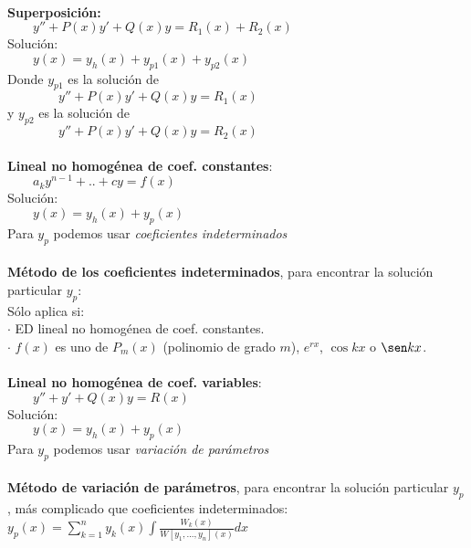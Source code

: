 \documentclass[a4paper,landscape,10pt]{cheatsheet}
\begin{document}
\hfill\\
\textbf{Superposición:}\\
$\qquad y''+P(x)y'+Q(x)y=R_1(x)+R_2(x)$\\
Solución:\\
$\qquad y(x)=y_h(x) + y_{p1}(x) + y_{p2}(x)$\\
\qquad\qquad Donde $y_{p1}$ es la solución de\\
$\qquad\qquad y''+P(x)y'+Q(x)y=R_1(x)$\\
\qquad\qquad y $y_{p2}$ es la solución de \\
$\qquad\qquad y''+P(x)y'+Q(x)y=R_2(x)$\\

\hfill\\
\textbf{Lineal no homogénea de coef. constantes}:\\
$\qquad a_ky^{n-1}+..+cy=f(x)$\\
Solución:\\
$\qquad y(x)=y_h(x)+y_p(x)$\\
Para $y_p$ podemos usar \textit{coeficientes indeterminados}\\

\hfill\\
\textbf{Método de los coeficientes indeterminados}, para encontrar la solución particular $y_p$:\\
Sólo aplica si:\\
\qquad $\cdot$ ED lineal no homogénea de coef. constantes.\\
\qquad $\cdot$ $f(x)$ es uno de $P_m(x)$ (polinomio de grado $m$), $e^{rx}$, $\cos kx$ o $\sen kx$.\\

\hfill\\
\textbf{Lineal no homogénea de coef. variables}:\\
$\qquad y''+y'+Q(x)y=R(x)$\\
Solución:\\
$\qquad y(x)=y_h(x)+y_p(x)$\\
Para $y_p$ podemos usar \textit{variación de parámetros}\\


\hfill\\
\textbf{Método de variación de parámetros}, para encontrar la solución particular $y_p$, más complicado que coeficientes indeterminados:\\
$y_p(x)=\sum_{k=1}^ny_k(x)\int\frac{W_k(x)}{W[y_1,...,y_n](x)}dx$\\
\end{document}
